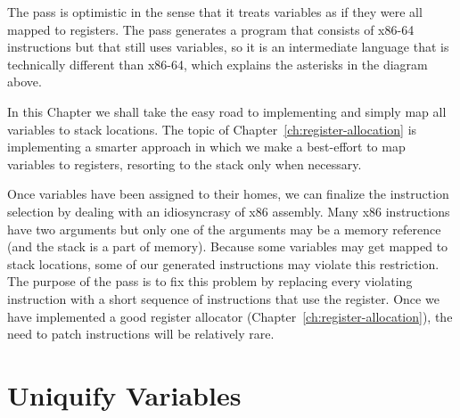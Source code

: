 \documentclass[11pt]{book}
\begin{document}
The  pass is optimistic in the sense that it
treats variables as if they were all mapped to registers. The
 pass generates a program that consists of
x86-64 instructions but that still uses variables, so it is an
intermediate language that is technically different than x86-64, which
explains the asterisks in the diagram above.

In this Chapter we shall take the easy road to implementing
 and simply map all variables to stack locations.
The topic of Chapter~\ref{ch:register-allocation} is implementing a
smarter approach in which we make a best-effort to map variables to
registers, resorting to the stack only when necessary.



Once variables have been assigned to their homes, we can finalize the
instruction selection by dealing with an idiosyncrasy of x86
assembly. Many x86 instructions have two arguments but only one of the
arguments may be a memory reference (and the stack is a part of
memory).  Because some variables may get mapped to stack locations,
some of our generated instructions may violate this restriction.  The
purpose of the  pass is to fix this problem by
replacing every violating instruction with a short sequence of
instructions that use the  register. Once we have implemented
a good register allocator (Chapter~\ref{ch:register-allocation}), the
need to patch instructions will be relatively rare.


\section{Uniquify Variables}
\label{sec:uniquify-s0}
\end{document}

